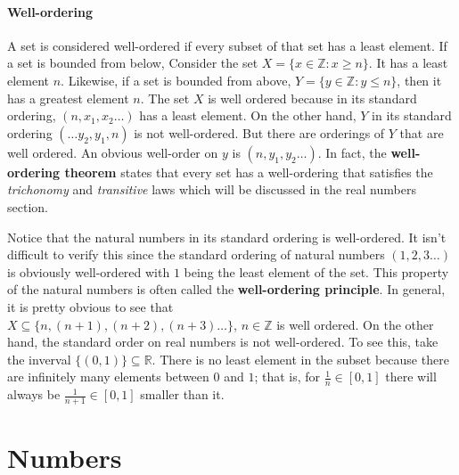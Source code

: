 \documentclass[12pt]{report}
\begin{document}
\subsubsection{Well-ordering}

\hspace*{\parindent}A set is considered well-ordered if every subset of that set has a least element. If a set is bounded from below, Consider the set $X=\{x \in \mathbb{Z} : x \geq n\}$. It has a least element $n$. Likewise, if a set is bounded from above, $Y=\{y \in \mathbb{Z} : y \leq n\}$, then it has a greatest element $n$. The set $X$ is well ordered because in its standard ordering, $(n, x_1, x_2 \dots)$ has a least element. On the other hand, $Y$ in its standard ordering $(\dots y_2, y_1, n)$ is not well-ordered. But there are orderings of $Y$ that are well ordered. An obvious well-order on $y$ is $(n, y_1, y_2 \dots)$. In fact, the \textbf{well-ordering theorem} states that every set has a well-ordering that satisfies the \textit{trichonomy} and \textit{transitive} laws which will be discussed in the real numbers section.

Notice that the natural numbers in its standard ordering is well-ordered. It isn't difficult to verify this since the standard ordering of natural numbers $(1, 2, 3 \dots)$ is obviously well-ordered with $1$ being the least element of the set. This property of the natural numbers is often called the \textbf{well-ordering principle}. In general, it is pretty obvious to see that \\
$X \subseteq \{n, (n+1), (n+2), (n+3)\dots \}$, $n \in \mathbb{Z}$ is well ordered.
On the other hand, the standard order on real numbers is not well-ordered. To see this, take the inverval $\{(0, 1)\} \subseteq \mathbb{R}$. There is no least element in the subset because there are infinitely many elements between $0$ and $1$; that is, for $\frac{1}{n} \in [0, 1]$ there will always be $\frac{1}{n+1} \in [0, 1]$ smaller than it.


\newpage

\chapter{Numbers}

\newpage
\end{document}
